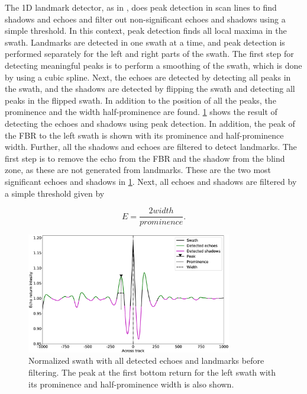 The 1D landmark detector, as in \cite{Al-Rawi2017LandmarkImages}, does peak detection in scan lines to find shadows and echoes and filter out non-significant echoes and shadows using a simple threshold. In this context, peak detection finds all local maxima in the swath. Landmarks are detected in one swath at a time, and peak detection is performed separately for the left and right parts of the swath. The first step for detecting meaningful peaks is to perform a smoothing of the swath, which is done by using a cubic spline. Next, the echoes are detected by detecting all peaks in the swath, and the shadows are detected by flipping the swath and detecting all peaks in the flipped swath. In addition to the position of all the peaks, the prominence and the width half-prominence are found. \cref{fig:1D_swath_w_landmarks} shows the result of detecting the echoes and shadows using peak detection. In addition, the peak of the FBR to the left swath is shown with its prominence and half-prominence width.
Further, all the shadows and echoes are filtered to detect landmarks. The first step is to remove the echo from the FBR and the shadow from the blind zone, as these are not generated from landmarks. These are the two most significant echoes and shadows in \cref{fig:1D_swath_w_landmarks}. Next, all echoes and shadows are filtered by a simple threshold given by

\begin{equation}
    E = \frac{2 width}{prominence}.
    \label{eq:1D_thres}
\end{equation}

\begin{figure}
    \centering
    \includegraphics[width=0.8\textwidth]{figures/1D_swath_w_landmarks.eps}
    \caption{Normalized swath with all detected echoes and landmarks before filtering. The peak at the first bottom return for the left swath with its prominence and half-prominence width is also shown.}
    \label{fig:1D_swath_w_landmarks}
\end{figure}

